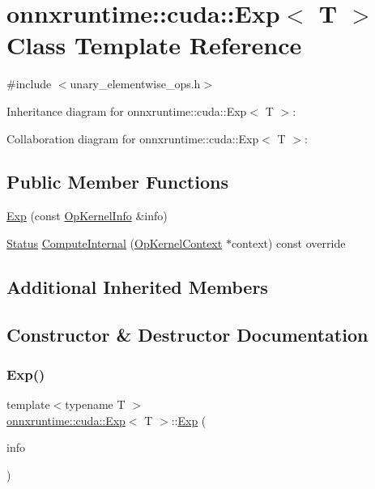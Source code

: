\hypertarget{classonnxruntime_1_1cuda_1_1Exp}{}\section{onnxruntime\+:\+:cuda\+:\+:Exp$<$ T $>$ Class Template Reference}
\label{classonnxruntime_1_1cuda_1_1Exp}


{\ttfamily \#include $<$unary\+\_\+elementwise\+\_\+ops.\+h$>$}



Inheritance diagram for onnxruntime\+:\+:cuda\+:\+:Exp$<$ T $>$\+:


Collaboration diagram for onnxruntime\+:\+:cuda\+:\+:Exp$<$ T $>$\+:
\subsection*{Public Member Functions}
\begin{DoxyCompactItemize}
\item 
\mbox{\hyperlink{classonnxruntime_1_1cuda_1_1Exp_a11d460d28f643b920ac533f5020fe6d2}{Exp}} (const \mbox{\hyperlink{classonnxruntime_1_1OpKernelInfo}{Op\+Kernel\+Info}} \&info)
\item 
\mbox{\hyperlink{classonnxruntime_1_1common_1_1Status}{Status}} \mbox{\hyperlink{classonnxruntime_1_1cuda_1_1Exp_a311efdccc5969833cb43fa07058186d0}{Compute\+Internal}} (\mbox{\hyperlink{classonnxruntime_1_1OpKernelContext}{Op\+Kernel\+Context}} $\ast$context) const override
\end{DoxyCompactItemize}
\subsection*{Additional Inherited Members}


\subsection{Constructor \& Destructor Documentation}
\mbox{\label{classonnxruntime_1_1cuda_1_1Exp_a11d460d28f643b920ac533f5020fe6d2}} 
\subsubsection{\texorpdfstring{Exp()}{Exp()}}
{\footnotesize\ttfamily template$<$typename T $>$ \\
\mbox{\hyperlink{classonnxruntime_1_1cuda_1_1Exp}{onnxruntime\+::cuda\+::\+Exp}}$<$ T $>$\+::\mbox{\hyperlink{classonnxruntime_1_1cuda_1_1Exp}{Exp}} (\begin{DoxyParamCaption}\item[{const \mbox{\hyperlink{classonnxruntime_1_1OpKernelInfo}{Op\+Kernel\+Info}} \&}]{info }\end{DoxyParamCaption})\hspace{0.3cm}{\ttfamily [inline]}}



